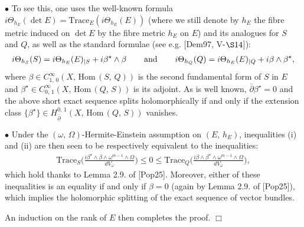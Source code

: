 \documentclass[12pt]{article}
\begin{document}
    $\bullet$ To see this, one uses the well-known formula $i\Theta_{h_E}(\det E) = \mbox{Trace}_E(i\Theta_{h_E}(E))$ (where we still denote by $h_E$ the fibre metric induced on $\det E$ by the fibre metric $h_E$ on $E$) and its analogues for $S$ and $Q$, as well as the standard formulae (see e.g. [Dem97, V-$\S14$]): \begin{eqnarray}\label{eqn:curvatures_S-Q_exact-seq}i\Theta_{h_S}(S) = i\Theta_{h_E}(E)_{|S} + i\beta^\star\wedge\beta \hspace{5ex}\mbox{and}\hspace{5ex} i\Theta_{h_Q}(Q) = i\Theta_{h_E}(E)_{|Q} + i\beta\wedge\beta^\star,\end{eqnarray} where $\beta\in C^\infty_{1,\,0}(X,\,\mbox{Hom}\,(S,\,Q))$ is the second fundamental form of $S$ in $E$ and $\beta^\star\in C^\infty_{0,\,1}(X,\,\mbox{Hom}\,(Q,\,S))$ is its adjoint. As is well known, $\bar\partial\beta^\star = 0$ and the above short exact sequence splits holomorphically if and only if the extension class $\{\beta^\star\}\in H^{0,\,1}_{\bar\partial}(X,\,\mbox{Hom}\,(Q,\,S))$ vanishes.

    $\bullet$ Under the $(\omega,\,\Omega)$-Hermite-Einstein assumption on $(E,\,h_E)$, inequalities (i) and (ii) are then seen to be respectively equivalent to the inequalities: \begin{eqnarray*}\mbox{Trace}_S\bigg(\frac{i\beta^\star\wedge\beta\wedge\omega^{m-1}\wedge\Omega}{dV_\omega}\bigg)\leq 0\leq\mbox{Trace}_Q\bigg(\frac{i\beta\wedge\beta^\star\wedge\omega^{m-1}\wedge\Omega}{dV_\omega}\bigg),\end{eqnarray*} which hold thanks to Lemma 2.9. of [Pop25]. Moreover, either of these inequalities is an equality if and only if $\beta=0$ (again by  Lemma 2.9. of [Pop25]), which implies the holomorphic splitting of the exact sequence of vector bundles.

\vspace{1ex}    

An induction on the rank of $E$ then completes the proof.    \hfill $\Box$


\vspace{3ex}

\end{document}
